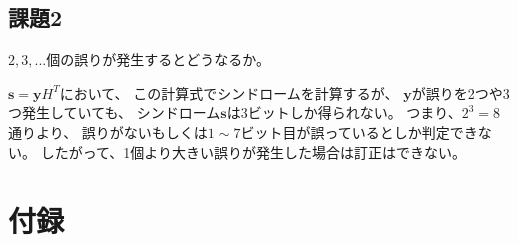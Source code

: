 \documentclass[12pt]{jarticle}
\begin{document}
\subsection{課題2}
\begin{shadebox}
    $2,3,...$個の誤りが発生するとどうなるか。
\end{shadebox}

$\boldsymbol{s}=\boldsymbol{y} H^T$において、
この計算式でシンドロームを計算するが、
$\boldsymbol{y}$が誤りを2つや3つ発生していても、
シンドローム$\boldsymbol{s}$は3ビットしか得られない。
つまり、$2^3=8$通りより、
誤りがないもしくは$1\sim 7$ビット目が誤っているとしか判定できない。
したがって、1個より大きい誤りが発生した場合は訂正はできない。

\clearpage
\appendix
\section{付録}
\end{document}
